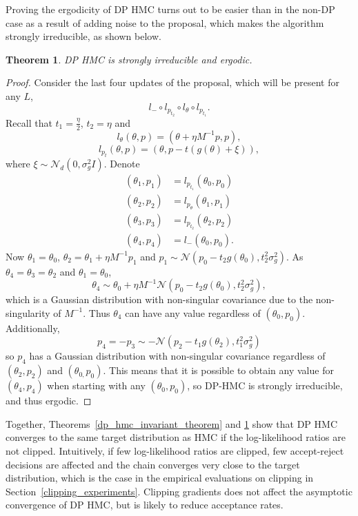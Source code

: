 \documentclass[english,twoside,openright]{HYgraduMLDS}
\newtheorem{theorem}[lemma]{Theorem}
\newcommand{\caln}{{\mathcal{N}}}
\begin{document}
Proving the ergodicity of DP HMC turns out to be easier than in the
non-DP case as a result of adding noise to the proposal, which makes the
algorithm strongly irreducible, as shown below.
\begin{theorem}\label{dp_hmc_ergodicity_theorem}
	DP HMC is strongly irreducible and ergodic.
\end{theorem}
\begin{proof}
  Consider the last four updates of the proposal, which will be present for any
  \(L\),
  \[
    l_{-}\circ l_{p_{t_{2}}}\circ l_{\theta}\circ l_{p_{t_{1}}}.
  \]
  Recall that \(t_{1} = \frac{\eta}{2}\), \(t_{2} = \eta\) and
  \[
    l_{\theta}(\theta, p) = (\theta + \eta M^{-1}p, p),
  \]
  \[
    l_{p_{t}}(\theta, p) = (\theta, p - t(g(\theta) + \xi)),
  \]
  where \(\xi \sim \caln_{d}(0, \sigma_{g}^2I)\). Denote
  \begin{align*}
    (\theta_{1}, p_{1}) &= l_{p_{t_{1}}}(\theta_{0}, p_{0})\\
    (\theta_{2}, p_{2}) &= l_{p_{\theta}}(\theta_{1}, p_{1})\\
    (\theta_{3}, p_{3}) &= l_{p_{t_{2}}}(\theta_{2}, p_{2})\\
    (\theta_{4}, p_{4}) &= l_{-}(\theta_{0}, p_{0}).
  \end{align*}
  Now \(\theta_{1} = \theta_{0}\), \(\theta_{2} = \theta_{1} + \eta M^{-1}p_{1}\)
  and \(p_{1}\sim \caln(p_{0} - t_{2}g(\theta_{0}), t_{2}^{2}\sigma_{g}^{2})\).
  As \(\theta_{4} = \theta_{3} = \theta_{2}\) and \(\theta_{1} = \theta_{0}\),
  \[
    \theta_{4}\sim \theta_{0} + \eta M^{-1}
    \caln(p_{0} - t_{2}g(\theta_{0}), t_{2}^{2}\sigma_{g}^{2}),
  \]
  which is a Gaussian distribution with non-singular covariance due to the
  non-singularity of \(M^{-1}\). Thus \(\theta_{4}\) can have any value
  regardless of \((\theta_{0}, p_{0})\). Additionally,
  \[
    p_{4} = -p_{3} \sim -\caln(p_{2} - t_{1}g(\theta_{2}), t_{1}^{2}\sigma_{g}^{2})
  \]
  so \(p_{4}\) has a Gaussian distribution with non-singular covariance
  regardless of \((\theta_{2}, p_{2})\) and \((\theta_{0, }p_{0})\). This means
  that it is possible to
  obtain any value for \((\theta_{4}, p_{4})\) when starting with any
  \((\theta_{0}, p_{0})\), so DP-HMC is strongly irreducible, and thus
  ergodic.
\end{proof}

Together, Theorems~\ref{dp_hmc_invariant_theorem} and \ref{dp_hmc_ergodicity_theorem}
show that DP HMC converges to the same target distribution as HMC if the
log-likelihood ratios are not clipped. Intuitively, if few log-likelihood ratios
are clipped, few accept-reject decisions are affected and the chain converges
very close to the target distribution, which is the case in the empirical
evaluations on clipping in Section~\ref{clipping_experiments}. Clipping gradients
does not affect the asymptotic convergence of DP HMC, but is likely to reduce
acceptance rates.
\end{document}
